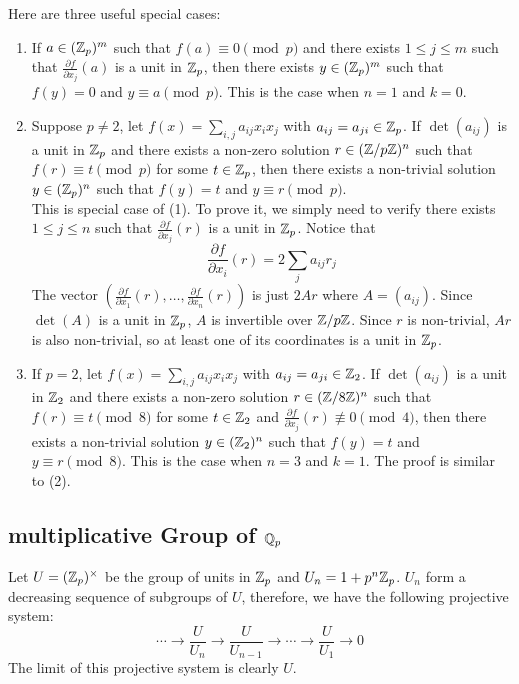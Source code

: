 \documentclass[15pt]{scrartcl}
\begin{document}
\begin{corollary}
    Here are three useful special cases:
    \begin{enumerate}
        \item If $a\in (\mathbb Z_p)^m$ such that $f(a)\equiv 0\pmod p$ and there exists $1\leq j \leq m$ such that $\frac{\partial f}{\partial x_j}(a)$ is a unit in $\mathbb Z_p$, then there exists $y\in (\mathbb Z_p)^m$ such that $f(y)=0$ and $y\equiv a \pmod{p}$. This is the case when $n=1$ and $k=0$. 
        \item Suppose $p\neq 2$, let $f(x)=\sum_{i,j} a_{ij}x_ix_j$ with $a_{ij}=a_{ji}\in \mathbb Z_p$. If $\det(a_{ij})$ is a unit in $\mathbb Z_p$ and there exists a non-zero solution $r\in (\mathbb Z/p\mathbb Z)^n$ such that $f(r)\equiv t \pmod p$ for some $t\in \mathbb Z_p$, then there exists a non-trivial solution $y\in (\mathbb Z_p)^n$ such that $f(y)=t$ and $y\equiv r \pmod{p}$. 
        \\

        This is special case of (1). To prove it, we simply need to verify there exists $1\leq j \leq n$ such that $\frac{\partial f}{\partial x_j}(r)$ is a unit in $\mathbb Z_p$. Notice that \[\frac{\partial f}{\partial x_i}(r)=2\sum_{j}a_{ij}r_j\] 
        The vector $(\frac{\partial f}{\partial x_1}(r),\ldots,\frac{\partial f}{\partial x_n}(r))$ is just $2A r$ where $A=(a_{ij})$. Since $\det(A)$ is a unit in $\mathbb Z_p$, $A$ is invertible over $\mathbb Z/p\mathbb Z$. Since $r$ is non-trivial, $Ar$ is also non-trivial, so at least one of its coordinates is a unit in $\mathbb Z_p$. 
        \item If $p=2$, let $f(x)=\sum_{i,j} a_{ij}x_ix_j$ with $a_{ij}=a_{ji}\in \mathbb Z_2$. If $\det(a_{ij})$ is a unit in $\mathbb Z_2$ and there exists a non-zero solution $r\in (\mathbb Z/8\mathbb Z)^n$ such that $f(r)\equiv t \pmod 8$ for some $t\in \mathbb Z_2$ and $\frac{\partial f}{\partial x_j}(r)\not\equiv 0 \pmod{4}$, then there exists a non-trivial solution $y\in (\mathbb Z_2)^n$ such that $f(y)=t$ and $y\equiv r \pmod{8}$. This is the case when $n=3$ and $k=1$. The proof is similar to (2).
    \end{enumerate}
\end{corollary}
\subsection{multiplicative Group of $\mathbb Q_p$}
Let $U=(\mathbb Z_p)^{\times}$ be the group of units in $\mathbb Z_p$ and $U_n=1+p^n\mathbb Z_p$. $U_n$ form a decreasing sequence of subgroups of $U$, therefore, we have the following projective system:
\[\cdots \to \frac{U}{U_n}\to \frac{U}{U_{n-1}} \to \cdots \to \frac{U}{U_1}\to 0\]
The limit of this projective system is clearly $U$. 
\\
\end{document}
